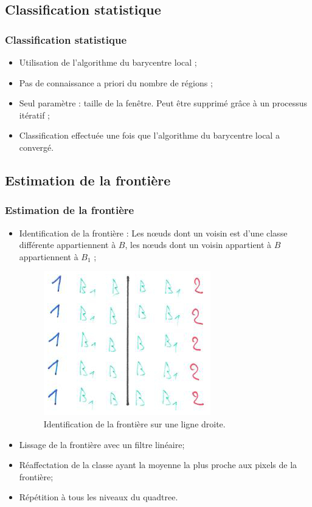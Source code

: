 \documentclass[handout]{beamer}
\begin{document}
		\subsection{Classification statistique}
		\begin{frame}
			\frametitle{Classification statistique}
				\begin{itemize}
					\item Utilisation de l'algorithme du barycentre local ;
					\item Pas de connaissance a priori du nombre de régions ;
					\item Seul paramètre : taille de la fenêtre. Peut être supprimé grâce à un processus itératif ;
					\item Classification effectuée une fois que l’algorithme du barycentre local a convergé.
				\end{itemize}
		\end{frame}

		\subsection{Estimation de la frontière}
		\begin{frame}
			\frametitle{Estimation de la frontière}
				\begin{itemize}
					\item Identification de la frontière : Les nœuds dont un voisin est d'une classe différente appartiennent à $B$, les nœuds dont un voisin appartient à $B$ appartiennent à $B_1$ ;
					\begin{figure}[H]
						\centering
						\includegraphics[scale=0.19]{images/bordure-3.jpg}
						\caption{Identification de la frontière sur une ligne droite.}
						\label{fig:quadtree2}
					\end{figure}
					\item Lissage de la frontière avec un filtre linéaire;
					\item Réaffectation de la classe ayant la moyenne la plus proche aux pixels de la frontière;
					\item Répétition à tous les niveaux du quadtree.
				\end{itemize}
		\end{frame}
\end{document}
